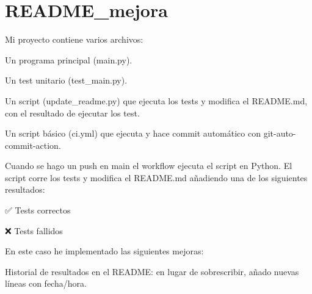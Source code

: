 \chapter{README\+\_\+mejora}
\hypertarget{md_README__mejora}{}\label{md_README__mejora}
Mi proyecto contiene varios archivos\+:
\begin{DoxyItemize}
\item Un programa principal (main.\+py).
\item Un test unitario (test\+\_\+main.\+py).
\item Un script (update\+\_\+readme.\+py) que ejecuta los tests y modifica el README.\+md, con el resultado de ejecutar los test.
\item Un script básico (ci.\+yml) que ejecuta y hace commit automático con git-\/auto-\/commit-\/action.
\end{DoxyItemize}

Cuando se hago un push en main el workflow ejecuta el script en Python. El script corre los tests y modifica el README.\+md añadiendo una de los siguientes resultados\+:

✅ Tests correctos

❌ Tests fallidos

En este caso he implementado las siguientes mejoras\+:
\begin{DoxyItemize}
\item Historial de resultados en el README\+: en lugar de sobrescribir, añado nuevas líneas con fecha/hora. 
\end{DoxyItemize}